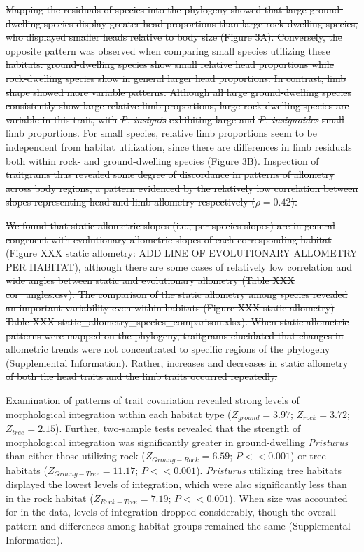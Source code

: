\documentclass[
  11pt,
]{article}
\providecommand{\DIFdeltex}[1]{{\protect\color{red}\sout{#1}}}                      %
\providecommand{\DIFdelbegin}{} %
\providecommand{\DIFdelend}{} %
\providecommand{\DIFdel}[1]{\texorpdfstring{\DIFdeltex{#1}}{}} %
\newcommand{\DIFscaledelfig}{0.5}
\newlength{\DIFdelgraphicswidth} %
\newlength{\DIFdelgraphicsheight} %
\newcommand{\DIFdelincludegraphics}[2][]{%
\sbox{\DIFdelgraphicsbox}{\DIFOincludegraphics[#1]{#2}}%
\settoboxwidth{\DIFdelgraphicswidth}{\DIFdelgraphicsbox} %
\settoboxtotalheight{\DIFdelgraphicsheight}{\DIFdelgraphicsbox} %
\scalebox{\DIFscaledelfig}{%
\parbox[b]{\DIFdelgraphicswidth}{\usebox{\DIFdelgraphicsbox}\\[-\baselineskip] \rule{\DIFdelgraphicswidth}{0em}}\llap{\resizebox{\DIFdelgraphicswidth}{\DIFdelgraphicsheight}{%
\setlength{\unitlength}{\DIFdelgraphicswidth}%
\begin{picture}(1,1)%
\thicklines\linethickness{2pt} %
{\color[rgb]{1,0,0}\put(0,0){\framebox(1,1){}}}%
{\color[rgb]{1,0,0}\put(0,0){\line( 1,1){1}}}%
{\color[rgb]{1,0,0}\put(0,1){\line(1,-1){1}}}%
\end{picture}%
}\hspace*{3pt}}} %
} %
\DeclareRobustCommand{\DIFdelbegin}{\DIFOdelbegin \let\includegraphics\DIFdelincludegraphics} %
\DeclareRobustCommand{\DIFdelend}{\DIFOaddend \let\includegraphics\DIFOincludegraphics} %
\begin{document}
\DIFdelbegin \DIFdel{Mapping the residuals of species into the phylogeny showed that large
ground-dwelling species display greater head proportions than large
rock-dwelling species, who displayed smaller heads relative to body size
(Figure 3A). Conversely, the opposite pattern was observed when
comparing small species utilizing these habitats: ground-dwelling
species show small relative head proportions while rock-dwelling species
show in general larger head proportions. In contrast, limb shape showed
more variable patterns. Although all large ground-dwelling species
consistently show large relative limb proportions, large rock-dwelling
species are variable in this trait, with }\emph{\DIFdel{P. insignis}} %
\DIFdel{exhibiting
large and }\emph{\DIFdel{P. insignoides}} %
\DIFdel{small limb proportions. For small
species, relative limb proportions seem to be independent from habitat
utilization, since there are differences in limb residuals both within
rock- and ground-dwelling species (Figure 3B). Inspection of traitgrams
thus revealed some degree of discordance in patterns of allometry across
body regions; a pattern evidenced by the relatively low correlation
between slopes representing head and limb allometry respectively
(\(\rho = 0.42\)). }%

\DIFdel{We found that static allometric slopes (i.e., per-species slopes) are in
general congruent with evolutionary allometric slopes of each
corresponding habitat (Figure XXX static allometry: ADD LINE OF
EVOLUTIONARY ALLOMETRY PER HABITAT), although there are some cases of
relatively low correlation and wide angles between static and
evolutionary allometry (Table XXX cor\_angles.csv). The comparison of
the static allometry among species revealed an important variability
even within habitats (Figure XXX static allometry) Table XXX
static\_allometry\_species\_comparison.xlsx). When static allometric
patterns were mapped on the phylogeny, traitgrams elucidated that
changes in allometric trends were not concentrated to specific regions
of the phylogeny (Supplemental Information). Rather, increases and
decreases in static allometry of both the head traits and the limb
traits occurred repeatedly. }%

\DIFdelend Examination of patterns of trait covariation revealed strong levels of
morphological integration within each habitat type (\(Z_{ground}=3.97\);
\(Z_{rock}=3.72\); \(Z_{tree}=2.15\)). Further, two-sample tests
revealed that the strength of morphological integration was
significantly greater in ground-dwelling \emph{Pristurus} than either
those utilizing rock (\(Z_{Groung-Rock}=6.59\); \(P << 0.001\)) or tree
habitats (\(Z_{Groung-Tree}=11.17\); \(P << 0.001\)). \emph{Pristurus}
utilizing tree habitats displayed the lowest levels of integration,
which were also significantly less than in the rock habitat
(\(Z_{Rock-Tree}=7.19\); \(P << 0.001\)). When size was accounted for in
the data, levels of integration dropped considerably, though the overall
pattern and differences among habitat groups remained the same
(Supplemental Information). \hfill\break
\end{document}
